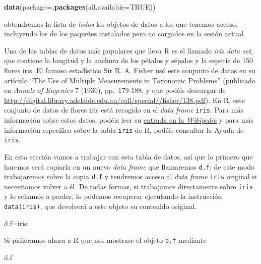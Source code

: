 \documentclass[]{book}
\newenvironment{Shaded}{\begin{snugshade}}{\end{snugshade}}
\newcommand{\DataTypeTok}[1]{\textcolor[rgb]{0.13,0.29,0.53}{#1}}
\newcommand{\KeywordTok}[1]{\textcolor[rgb]{0.13,0.29,0.53}{\textbf{#1}}}
\newcommand{\NormalTok}[1]{#1}
\newcommand{\OtherTok}[1]{\textcolor[rgb]{0.56,0.35,0.01}{#1}}
\theoremstyle{definition}
\theoremstyle{definition}
\theoremstyle{definition}
\theoremstyle{remark}
\begin{document}
\begin{Shaded}
\begin{Highlighting}[]
\KeywordTok{data}\NormalTok{(}\DataTypeTok{package=}\KeywordTok{.packages}\NormalTok{(}\DataTypeTok{all.available=}\OtherTok{TRUE}\NormalTok{))}
\end{Highlighting}
\end{Shaded}

obtendremos la lista de \emph{todos} los objetos de datos a los que tenemos acceso, incluyendo los de los paquetes instalados pero no cargados en la sesión actual.

Una de las tablas de datos más populares que lleva R es el llamado \emph{iris data set}, que contiene la longitud y la anchura de los pétalos y sépalos y la especie de 150 flores iris. El famoso estadístico Sir R. A. Fisher usó este conjunto de datos en su artículo ``The Use of Multiple Measurements in Taxonomic Problems'' (publicado en \emph{Annals of Eugenics} 7 (1936), pp.~179-188, y que podéis descargar de \url{http://digital.library.adelaide.edu.au/coll/special//fisher/138.pdf}). En R, este conjunto de datos de flores iris está recogido en el \emph{data frame} \texttt{iris}. Para más información sobre estos datos, podéis leer su \href{http://en.wikipedia.org/wiki/Iris_flower_data_set}{entrada en la \emph{Wikipedia}} y para más información específica sobre la tabla \texttt{iris} de R, podéis consultar la Ayuda de \texttt{iris}.

En esta sección vamos a trabajar con esta tabla de datos, así que lo primero que haremos será copiarla en un nuevo \emph{data frame} que llamaremos \texttt{d.f}; de este modo trabajaremos sobre la copia \texttt{d.f} y tendremos acceso al \emph{data frame} \texttt{iris} original si necesitamos volver a él. De todas formas, si trabajamos directamente sobre \texttt{iris} y lo echamos a perder, lo podemos recuperar ejecutando la instrucción \texttt{data(iris)}, que devolverá a este objeto su contenido original.

\begin{Shaded}
\begin{Highlighting}[]
\NormalTok{d.f=iris}
\end{Highlighting}
\end{Shaded}

Si pidiéramos ahora a R que nos mostrase el objeto \texttt{d.f} mediante

\begin{Shaded}
\begin{Highlighting}[]
\NormalTok{d.f}
\end{Highlighting}
\end{Shaded}
\end{document}
